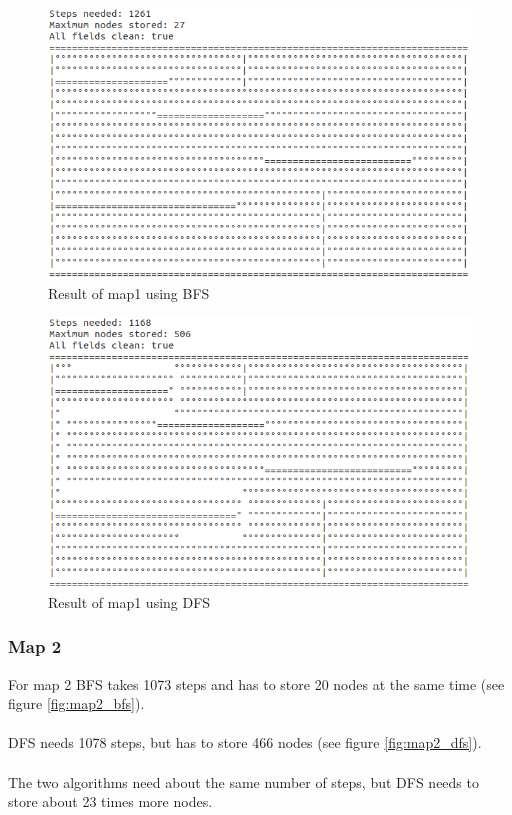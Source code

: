 \documentclass[paper=a4, fontsize=11pt]{scrartcl} %
\numberwithin{equation}{section} %
\numberwithin{figure}{section} %
\numberwithin{table}{section} %
\begin{document}
\begin{figure}[Ht]
	\centering
  \includegraphics[width=1\textwidth]{images/map1_bfs.png}
	\caption{Result of map1 using BFS}
	\label{fig:map1_bfs}
\end{figure}

\begin{figure}[Ht]
	\centering
  \includegraphics[width=1\textwidth]{images/map1_dfs.png}
	\caption{Result of map1 using DFS}
	\label{fig:map1_dfs}
\end{figure}
 
\subsubsection{Map 2}
For map 2 BFS takes 1073 steps and has to store 20 nodes at the same time (see figure \ref{fig:map2_bfs}).\\\\
DFS needs 1078 steps, but has to store 466 nodes (see figure \ref{fig:map2_dfs}).\\\\
The two algorithms need about the same number of steps, but DFS needs to store about 23 times more nodes.\\
\end{document}
